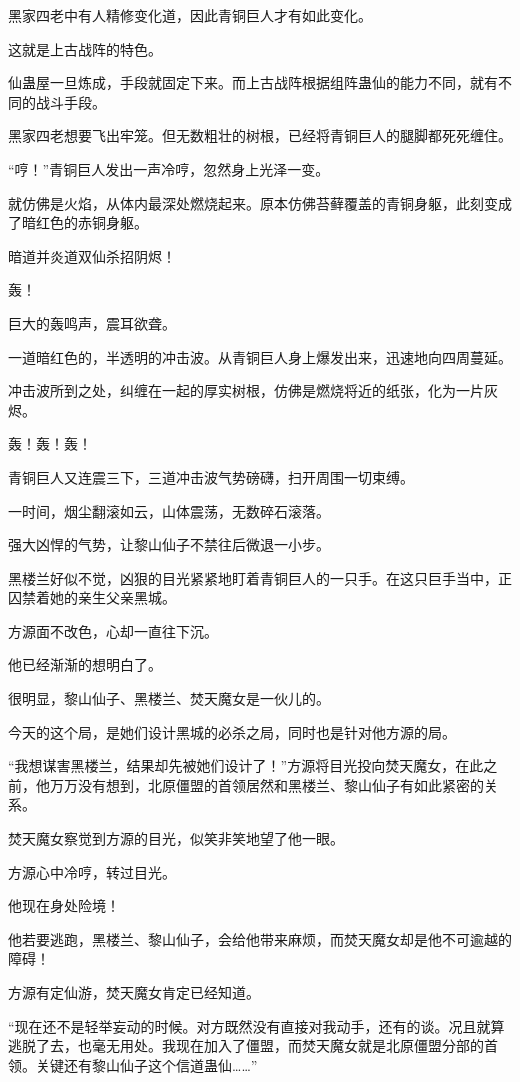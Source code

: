 \begin{this_body}
黑家四老中有人精修变化道，因此青铜巨人才有如此变化。

这就是上古战阵的特色。

仙蛊屋一旦炼成，手段就固定下来。而上古战阵根据组阵蛊仙的能力不同，就有不同的战斗手段。

黑家四老想要飞出牢笼。但无数粗壮的树根，已经将青铜巨人的腿脚都死死缠住。

“哼！”青铜巨人发出一声冷哼，忽然身上光泽一变。

就仿佛是火焰，从体内最深处燃烧起来。原本仿佛苔藓覆盖的青铜身躯，此刻变成了暗红色的赤铜身躯。

暗道并炎道双仙杀招阴烬！

轰！

巨大的轰鸣声，震耳欲聋。

一道暗红色的，半透明的冲击波。从青铜巨人身上爆发出来，迅速地向四周蔓延。

冲击波所到之处，纠缠在一起的厚实树根，仿佛是燃烧将近的纸张，化为一片灰烬。

轰！轰！轰！

青铜巨人又连震三下，三道冲击波气势磅礴，扫开周围一切束缚。

一时间，烟尘翻滚如云，山体震荡，无数碎石滚落。

强大凶悍的气势，让黎山仙子不禁往后微退一小步。

黑楼兰好似不觉，凶狠的目光紧紧地盯着青铜巨人的一只手。在这只巨手当中，正囚禁着她的亲生父亲黑城。

方源面不改色，心却一直往下沉。

他已经渐渐的想明白了。

很明显，黎山仙子、黑楼兰、焚天魔女是一伙儿的。

今天的这个局，是她们设计黑城的必杀之局，同时也是针对他方源的局。

“我想谋害黑楼兰，结果却先被她们设计了！”方源将目光投向焚天魔女，在此之前，他万万没有想到，北原僵盟的首领居然和黑楼兰、黎山仙子有如此紧密的关系。

焚天魔女察觉到方源的目光，似笑非笑地望了他一眼。

方源心中冷哼，转过目光。

他现在身处险境！

他若要逃跑，黑楼兰、黎山仙子，会给他带来麻烦，而焚天魔女却是他不可逾越的障碍！

方源有定仙游，焚天魔女肯定已经知道。

“现在还不是轻举妄动的时候。对方既然没有直接对我动手，还有的谈。况且就算逃脱了去，也毫无用处。我现在加入了僵盟，而焚天魔女就是北原僵盟分部的首领。关键还有黎山仙子这个信道蛊仙……”


\end{this_body}
